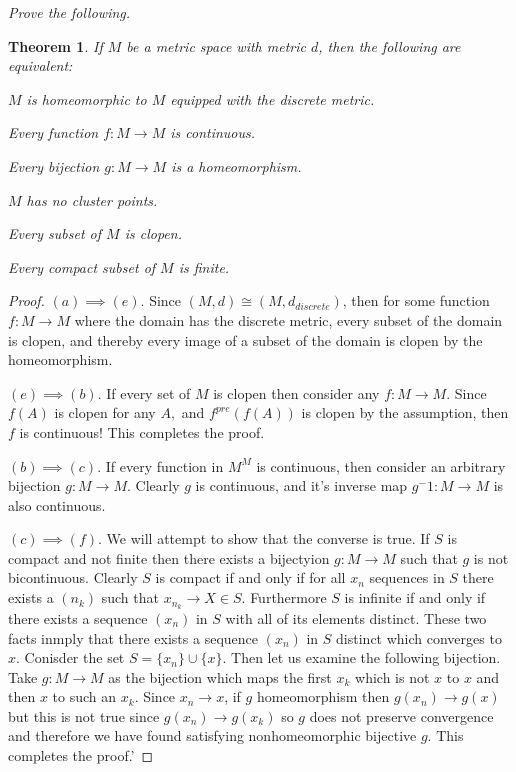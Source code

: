 \documentclass[letter]{article}
\newtheorem{theorem}{Theorem}
\newenvironment{menumerate}{%
  \edef\backupindent{\the\parindent}%
  \enumerate%
  \setlength{\parindent}{\backupindent}%
}{\endenumerate}
\begin{document}
\begin{menumerate}
		\setcounter{enumi}{39}
		\item \emph{Prove the following.}
			\begin{theorem}
				If $M$ be a metric space with metric $d$, then the following are equivalent:
				\begin{menumerate}
					\item $M$ is homeomorphic to $M$ equipped with the discrete metric.
					\item Every function $f:M \to M$ is continuous.
					\item Every bijection $g: M \to M$ is a homeomorphism.
					\item $M$ has no cluster points.
					\item Every subset of $M$ is clopen.
					\item Every compact subset of $M$ is finite.
				\end{menumerate}
			\end{theorem}
			\begin{proof}
				$(a) \implies (e)$. Since $(M,d) \cong (M,d_{discrete})$, then for some function $f:M \to M$ where the domain has the discrete metric, every subset of the domain is clopen, and thereby every image of a subset of the domain is clopen by the homeomorphism.


				$(e) \implies (b).$ If every set of $M$ is clopen then consider any $f: M \to M$. Since $f(A)$ is clopen for any $A,$ and $f^{pre}(f(A))$ is clopen by the assumption, then $f$ is continuous! This completes the proof.
 
				$(b) \implies (c).$ If every function in $M^{M}$ is continuous, then consider an arbitrary bijection $g: M \to M.$ Clearly $g$ is continuous, and it's inverse map $g^-1 : M \to M$ is also continuous.

				$(c) \implies (f).$ We will attempt to show that the converse is true. If $S$ is compact and not finite then there exists a bijectyion $g:M\to M$ such that $g$ is not bicontinuous. 	Clearly $S$ is compact if and only if for all $x_n$ sequences in $S$ there exists a $(n_k)$ such that $x_{n_k} \to X \in S.$ Furthermore $S$ is infinite if and only if there 
					exists a sequence $(x_n) $ in $S$ with all of its elements distinct. These two facts inmply that there exists a sequence $(x_n)$ in $S$ distinct which converges to $x$. Conisder the set $S = \{x_n\} \cup \{x\}.$ Then let us examine the following bijection. Take $g: M \to M$ as the bijection which maps the first $x_k$ which is not $x$ to $x$ and then $x$ to such an $x_k$. Since $x_n \to x$, if $g$ homeomorphism then $g(x_n) \to g(x)$ but this is not true since $g(x_n) \to g(x_k)$ so $g$ does not preserve convergence and therefore we have found satisfying  nonhomeomorphic bijective $g$. This completes the proof.'


\end{proof}
\end{menumerate}
\end{document}
